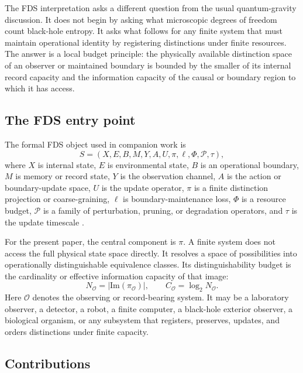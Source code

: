 \documentclass[10pt,a4paper,twocolumn,aps,prl]{revtex4-2}
\newcommand{\Obs}{\mathcal{O}}
\newcommand{\NA}{N_{\Obs}}
\newcommand{\CA}{C_{\Obs}}
\begin{document}
The FDS interpretation asks a different question from the usual quantum-gravity discussion. It does not begin by asking what microscopic degrees of freedom count black-hole entropy. It asks what follows for any finite system that must maintain operational identity by registering distinctions under finite resources. The answer is a local budget principle: the physically available distinction space of an observer or maintained boundary is bounded by the smaller of its internal record capacity and the information capacity of the causal or boundary region to which it has access.

\subsection{The FDS entry point}

The formal FDS object used in companion work is
\begin{equation}
S=(X,E,B,M,Y,A,U,\pi,\ell,\Phi,\mathcal{P},\tau),
\label{eq:fds-tuple}
\end{equation}
where $X$ is internal state, $E$ is environmental state, $B$ is an operational boundary, $M$ is memory or record state, $Y$ is the observation channel, $A$ is the action or boundary-update space, $U$ is the update operator, $\pi$ is a finite distinction projection or coarse-graining, $\ell$ is boundary-maintenance loss, $\Phi$ is a resource budget, $\mathcal{P}$ is a family of perturbation, pruning, or degradation operators, and $\tau$ is the update timescale \cite{wu2026fds,wufdsagency2026}.

For the present paper, the central component is $\pi$. A finite system does not access the full physical state space directly. It resolves a space of possibilities into operationally distinguishable equivalence classes. Its distinguishability budget is the cardinality or effective information capacity of that image:
\begin{equation}
\NA=|\mathrm{Im}(\pi_{\Obs})|,\qquad \CA=\log_2\NA.
\label{eq:dist-budget-intro}
\end{equation}
Here $\Obs$ denotes the observing or record-bearing system. It may be a laboratory observer, a detector, a robot, a finite computer, a black-hole exterior observer, a biological organism, or any subsystem that registers, preserves, updates, and orders distinctions under finite capacity.

\subsection{Contributions}
\end{document}
